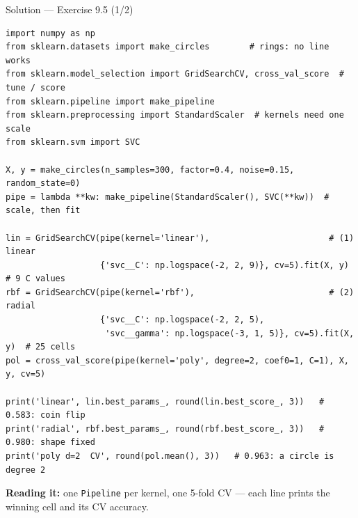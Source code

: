 \documentclass[aspectratio=169,11pt]{beamer}
\begin{document}
\begin{frame}[fragile]{Solution --- Exercise 9.5 (1/2)}
\begin{solutionbox}
\begin{lstlisting}[basicstyle=\ttfamily\tiny]
import numpy as np
from sklearn.datasets import make_circles        # rings: no line works
from sklearn.model_selection import GridSearchCV, cross_val_score  # tune / score
from sklearn.pipeline import make_pipeline
from sklearn.preprocessing import StandardScaler  # kernels need one scale
from sklearn.svm import SVC

X, y = make_circles(n_samples=300, factor=0.4, noise=0.15, random_state=0)
pipe = lambda **kw: make_pipeline(StandardScaler(), SVC(**kw))  # scale, then fit

lin = GridSearchCV(pipe(kernel='linear'),                        # (1) linear
                   {'svc__C': np.logspace(-2, 2, 9)}, cv=5).fit(X, y)  # 9 C values
rbf = GridSearchCV(pipe(kernel='rbf'),                           # (2) radial
                   {'svc__C': np.logspace(-2, 2, 5),
                    'svc__gamma': np.logspace(-3, 1, 5)}, cv=5).fit(X, y)  # 25 cells
pol = cross_val_score(pipe(kernel='poly', degree=2, coef0=1, C=1), X, y, cv=5)

print('linear', lin.best_params_, round(lin.best_score_, 3))   # 0.583: coin flip
print('radial', rbf.best_params_, round(rbf.best_score_, 3))   # 0.980: shape fixed
print('poly d=2  CV', round(pol.mean(), 3))   # 0.963: a circle is degree 2
\end{lstlisting}
{\scriptsize\textbf{Reading it:} one \texttt{Pipeline} per kernel, one 5-fold
CV --- each line prints the winning cell and its CV accuracy.}
\end{solutionbox}
\end{frame}
\end{document}
